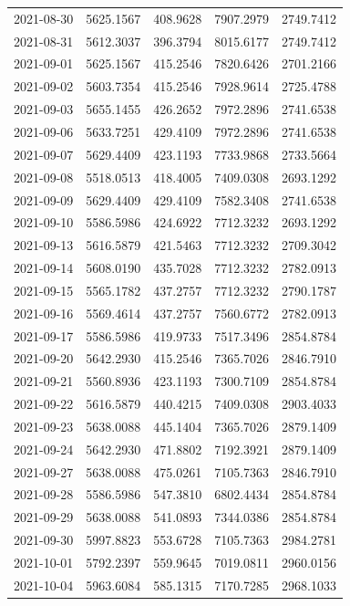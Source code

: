 {\begin{longtable}{lllll}
2021-08-30 & 5625.1567 & 408.9628 & 7907.2979 & 2749.7412 \\
2021-08-31 & 5612.3037 & 396.3794 & 8015.6177 & 2749.7412 \\
2021-09-01 & 5625.1567 & 415.2546 & 7820.6426 & 2701.2166 \\
2021-09-02 & 5603.7354 & 415.2546 & 7928.9614 & 2725.4788 \\
2021-09-03 & 5655.1455 & 426.2652 & 7972.2896 & 2741.6538 \\
2021-09-06 & 5633.7251 & 429.4109 & 7972.2896 & 2741.6538 \\
2021-09-07 & 5629.4409 & 423.1193 & 7733.9868 & 2733.5664 \\
2021-09-08 & 5518.0513 & 418.4005 & 7409.0308 & 2693.1292 \\
2021-09-09 & 5629.4409 & 429.4109 & 7582.3408 & 2741.6538 \\
2021-09-10 & 5586.5986 & 424.6922 & 7712.3232 & 2693.1292 \\
2021-09-13 & 5616.5879 & 421.5463 & 7712.3232 & 2709.3042 \\
2021-09-14 & 5608.0190 & 435.7028 & 7712.3232 & 2782.0913 \\
2021-09-15 & 5565.1782 & 437.2757 & 7712.3232 & 2790.1787 \\
2021-09-16 & 5569.4614 & 437.2757 & 7560.6772 & 2782.0913 \\
2021-09-17 & 5586.5986 & 419.9733 & 7517.3496 & 2854.8784 \\
2021-09-20 & 5642.2930 & 415.2546 & 7365.7026 & 2846.7910 \\
2021-09-21 & 5560.8936 & 423.1193 & 7300.7109 & 2854.8784 \\
2021-09-22 & 5616.5879 & 440.4215 & 7409.0308 & 2903.4033 \\
2021-09-23 & 5638.0088 & 445.1404 & 7365.7026 & 2879.1409 \\
2021-09-24 & 5642.2930 & 471.8802 & 7192.3921 & 2879.1409 \\
2021-09-27 & 5638.0088 & 475.0261 & 7105.7363 & 2846.7910 \\
2021-09-28 & 5586.5986 & 547.3810 & 6802.4434 & 2854.8784 \\
2021-09-29 & 5638.0088 & 541.0893 & 7344.0386 & 2854.8784 \\
2021-09-30 & 5997.8823 & 553.6728 & 7105.7363 & 2984.2781 \\
2021-10-01 & 5792.2397 & 559.9645 & 7019.0811 & 2960.0156 \\
2021-10-04 & 5963.6084 & 585.1315 & 7170.7285 & 2968.1033 \\

\end{longtable}}

